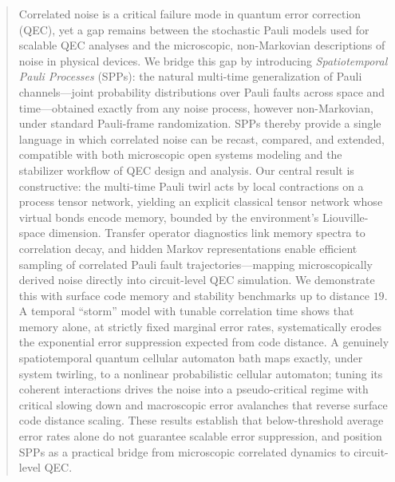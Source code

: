 \documentclass[
    aps,
    prx,
    reprint,
    superscriptaddress,
    longbibliography,
    nofootinbib,
    floatfix,
]{revtex4-2}
\begin{document}
\begin{abstract}
    Correlated noise is a critical failure mode in quantum error correction (QEC), yet a gap remains between the stochastic Pauli models used for scalable QEC analyses and the microscopic, non-Markovian descriptions of noise in physical devices. We bridge this gap by introducing \emph{Spatiotemporal Pauli Processes} (SPPs): the natural multi-time generalization of Pauli channels---joint probability distributions over Pauli faults across space and time---obtained exactly from any noise process, however non-Markovian, under standard Pauli-frame randomization. SPPs thereby provide a single language in which correlated noise can be recast, compared, and extended, compatible with both microscopic open systems modeling and the stabilizer workflow of QEC design and analysis. Our central result is constructive: the multi-time Pauli twirl acts by local contractions on a process tensor network, yielding an explicit classical tensor network whose virtual bonds encode memory, bounded by the environment's Liouville-space dimension. Transfer operator diagnostics link memory spectra to correlation decay, and hidden Markov representations enable efficient sampling of correlated Pauli fault trajectories---mapping microscopically derived noise directly into circuit-level QEC simulation. We demonstrate this with surface code memory and stability benchmarks up to distance \(19\). A temporal ``storm'' model with tunable correlation time shows that memory alone, at strictly fixed marginal error rates, systematically erodes the exponential error suppression expected from code distance. A genuinely spatiotemporal quantum cellular automaton bath maps exactly, under system twirling, to a nonlinear probabilistic cellular automaton; tuning its coherent interactions drives the noise into a pseudo-critical regime with critical slowing down and macroscopic error avalanches that reverse surface code distance scaling. These results establish that below-threshold average error rates alone do not guarantee scalable error suppression, and position SPPs as a practical bridge from microscopic correlated dynamics to circuit-level QEC.
\end{abstract}

\maketitle

\tableofcontents
\end{document}
